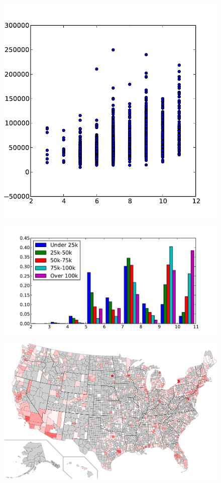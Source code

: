 \documentclass{sig-alternate-10pt}
\begin{document}
\begin{figure}
\centering
        \includegraphics[width=0.9\linewidth]{figs/maxIncome_maxDown.pdf}
  \caption{}
  \label{fig:services-hist}
\end{figure}

\begin{figure}
\centering
        \includegraphics[width=0.9\linewidth]{figs/all_hist.pdf}
  \caption{}
  \label{fig:services-hist}
\end{figure}

\begin{figure}
\centering
        \includegraphics[width=0.9\linewidth]{figs/counties_btMaxDown.pdf}
  \caption{}
  \label{fig:services-hist}
\end{figure}
\end{document}
